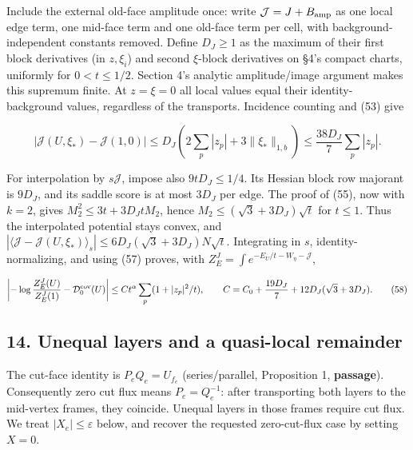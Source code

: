\documentclass[11pt,a4paper]{article}
\begin{document}
Include the external old-face amplitude once: write
\(\mathcal J=J+B_{\rm amp}\) as one local edge term, one mid-face term
and one old-face term per cell, with background-independent constants
removed. Define \(D_J\ge1\) as the maximum of their first block
derivatives (in \(z,\xi_i\)) and second \(\xi\)-block derivatives on
§4's compact charts, uniformly for \(0<t\le1/2\). Section 4's analytic
amplitude/image argument makes this supremum finite. At \(z=\xi=0\) all
local values equal their identity-background values, regardless of the
transports. Incidence counting and (53) give

\[|\mathcal J(U,\xi_*)-\mathcal J(1,0)|
\le D_J(2\sum_p|z_p|+3\|\xi_*\|_{1,b})
\le\frac{38D_J}{7}\sum_p|z_p|.\tag{57}\]

For interpolation by \(s\mathcal J\), impose also \(9tD_J\le1/4\). Its
Hessian block row majorant is \(9D_J\), and its saddle score is at most
\(3D_J\) per edge. The proof of (55), now with \(k=2\), gives
\(M_2^2\le3t+3D_JtM_2\), hence \(M_2\le(\sqrt3+3D_J)\sqrt t\) for
\(t\le1\). Thus the interpolated potential stays convex, and
\(|\langle\mathcal J-\mathcal J(U,\xi_*)\rangle_s| \le6D_J(\sqrt3+3D_J)N\sqrt t\).
Integrating in \(s\), identity-normalizing, and using (57) proves, with
\(Z_E^J=\int e^{-E_U/t-W_\eta-\mathcal J}\),

\[\left|-\log\frac{Z_E^J(U)}{Z_E^J(1)}-\mathcal D_0^{\rm cov}(U)\right|
\le C t^\alpha\sum_p(1+|z_p|^2/t),\qquad
C=C_0+\frac{19D_J}{7}+12D_J(\sqrt3+3D_J).\tag{58}\]

\hypertarget{unequal-layers-and-a-quasi-local-remainder}{%
\subsection{14. Unequal layers and a quasi-local
remainder}\label{unequal-layers-and-a-quasi-local-remainder}}

The cut-face identity is \(P_eQ_e=U_{f_e}\) (series/parallel,
Proposition 1, \textbf{passage}). Consequently zero cut flux means
\(P_e=Q_e^{-1}\): after transporting both layers to the mid-vertex
frames, they coincide. Unequal layers in those frames require cut flux.
We treat \(|X_e|\le\varepsilon\) below, and recover the requested
zero-cut-flux case by setting \(X=0\).
\end{document}
